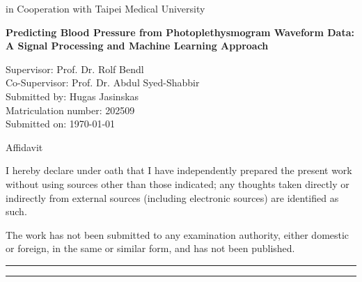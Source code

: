 \documentclass[12pt, bibliography=totoc]{scrartcl}
\begin{document}
\begin{titlepage}
\begin{center}
        \vspace{0.5cm}
        \Large
        in Cooperation with Taipei Medical University
        
        \hrulefill
            
        \vspace{1cm}
        
        \Huge
        \textbf{Predicting Blood Pressure from Photoplethysmogram Waveform Data: A Signal Processing and
Machine Learning Approach}
        
    	\end{center}
    
		\vfill
    		\Large
    		\noindent
    		Supervisor: \tab\hspace{-2cm} Prof. Dr. Rolf Bendl\\
    		Co-Supervisor: \tab\hspace{-2cm} Prof. Dr. Abdul Syed-Shabbir\\
    		Submitted by: \tab\hspace{-2cm} Hugas Jasinskas\\
    		Matriculation number: \tab\hspace{-2cm} 202509\\
    		Submitted on: \tab\hspace{-2cm} \today{}\\
    
\end{titlepage}

\newpage

\begin{Huge}
	\centerline{Affidavit}
\end{Huge}

\vspace{2cm}

\begin{Large}

I hereby declare under oath that I have independently prepared the present work without using sources other than those indicated; any thoughts taken directly or indirectly from external sources (including electronic sources) are identified as such.

The work has not been submitted to any examination authority, either domestic or foreign, in the same or similar form, and has not been published.

\end{Large}

\vfill

\rule{4cm}{0.5mm} \tab \rule{4cm}{0.5mm}
\end{document}
